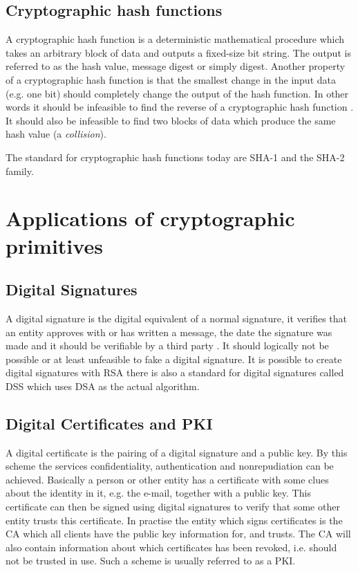 \documentclass[pdftex,english,10pt,b5paper,twoside]{book}
\begin{document}
\subsection{Cryptographic hash functions}
A cryptographic hash function is a deterministic mathematical procedure which
takes an arbitrary block of data and outputs a fixed-size bit string. The output
is referred to as the hash value, message digest or simply digest.
Another property of a cryptographic hash function is that the smallest change in
the input data (e.g. one bit) should completely change the output of the hash
function. In other words it should be infeasible to find the reverse of a
cryptographic hash function \cite[p. 335]{stallings}. It should also be infeasible to
find two blocks of data which produce the same hash value (a \emph{collision}).

The standard for cryptographic hash functions today are \ac{SHA}-1 and the
\ac{SHA}-2 family.

\section{Applications of cryptographic primitives}

\subsection{Digital Signatures}
A digital signature is the digital equivalent of a normal signature, it
verifies that an entity approves with or has written a message, the date the
signature was made and it should be verifiable by a third party \cite[p.
379]{stallings}. It should logically not be possible or at least unfeasible to
fake a digital signature. It is possible to create digital signatures with
\ac{RSA} there is also a standard for digital signatures called \ac{DSS} which
uses \ac{DSA} as the actual algorithm.

\subsection{Digital Certificates and PKI} A digital certificate is the pairing
of a digital signature and a public key\cite{stallings}.  By this scheme the
services confidentiality, authentication and nonrepudiation can be achieved.
Basically a person or other entity has a certificate with some clues about the
identity in it, e.g. the e-mail, together with a public key. This certificate
can then be signed using digital signatures to verify that some other entity
trusts this certificate. In practise the entity which signs certificates is the
\ac{CA} which all clients have the public key information for, and trusts. The
\ac{CA} will also contain information about which certificates has been
revoked, i.e. should not be trusted in use. Such a scheme is usually referred
to as a \ac{PKI}.
\end{document}
